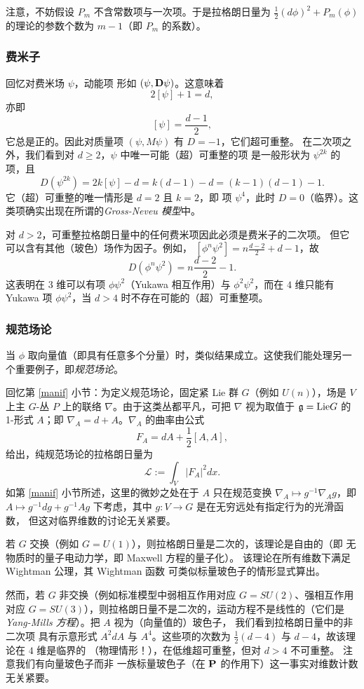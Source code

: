 注意，不妨假设 $P_m$ 不含常数项与一次项。于是拉格朗日量为 $\frac{1}{2}(d \phi)^2+P_m(\phi)$ 的理论的参数个数为 $m-1$（即 $P_m$ 的系数）。

\subsubsection{费米子}

回忆对费米场 $\psi$，动能项
形如 $(\psi,\bold D\psi)$。这意味着
$$
2[\psi]+1=d,
$$
亦即
$$
[\psi]=\frac{d-1}{2},
$$
它总是正的。因此对质量项 $(\psi,M\psi)$ 有 $D=-1$，它们超可重整。
在二次项之外，我们看到对 $d\ge 2$，$\psi$ 中唯一可能（超）可重整的项
是一般形状为 $\psi^{2k}$ 的项，且
$$
D(\psi^{2k})=2k[\psi]-d=k(d-1)-d=(k-1)(d-1)-1.
$$
它（超）可重整的唯一情形是 $d=2$ 且 $k=2$，即
项 $\psi^4$，此时 $D=0$（临界）。这类项确实出现在所谓的\emph{Gross-Neveu 模型}中。

对 $d>2$，可重整拉格朗日量中的任何费米项因此必须是费米子的二次项。
但它可以含有其他（玻色）场作为因子。例如，
$[\phi^n\psi^2]=n\frac{d-2}{2}+d-1$，故
$$
D(\phi^n\psi^2)=n\frac{d-2}{2}-1.
$$
这表明在 3 维可以有项
$\phi\psi^2$（Yukawa 相互作用）与 $\phi^2\psi^2$，而在 $4$ 维只能有
Yukawa 项 $\phi\psi^2$，当 $d>4$ 时不存在可能的（超）可重整项。

\subsubsection{规范场论}
当 $\phi$ 取向量值（即具有任意多个分量）时，类似结果成立。这使我们能处理另一个重要例子，即\emph{规范场论}。

回忆第 \ref{manif} 小节：为定义规范场论，固定紧 Lie 群 $G$（例如 $U(n)$），场是 $V$ 上主 $G$-丛 $P$ 上的联络 $\nabla$。由于这类丛都平凡，可把 $\nabla$ 视为取值于 $\g={\rm Lie}G$ 的 1-形式 $A$；即 $\nabla_A=d+A$。$\nabla_A$ 的曲率由公式
$$
F_A=dA+\frac{1}{2}[A,A],
$$
给出，纯规范场论的拉格朗日量为
$$
\mathcal L:=\int_V |F_A|^2dx.
$$
如第 \ref{manif} 小节所述，这里的微妙之处在于 $A$ 只在规范变换
$\nabla_A\mapsto g^{-1}\nabla_Ag$，即
$A\mapsto g^{-1}dg+g^{-1}Ag$ 下考虑，其中 $g: V\to G$
是在无穷远处有指定行为的光滑函数，
但这对临界维数的讨论无关紧要。

若 $G$ 交换（例如 $G=U(1)$），则拉格朗日量是二次的，该理论是自由的（即
无物质时的量子电动力学，即 Maxwell 方程的量子化）。
该理论在所有维数下满足 Wightman 公理，其 Wightman 函数
可类似标量玻色子的情形显式算出。

然而，若 $G$ 非交换（例如标准模型中弱相互作用对应 $G=SU(2)$、强相互作用对应 $G=SU(3)$），则拉格朗日量不是二次的，运动方程不是线性的（它们是\emph{Yang-Mills 方程}）。把 $A$ 视为（向量值的）玻色子，
我们看到拉格朗日量中的非二次项
具有示意形式 $A^2dA$ 与 $A^4$。这些项的次数为
$\frac{1}{2}(d-4)$ 与 $d-4$，故该理论在 $4$ 维是临界的
（物理情形！），在低维超可重整，但对 $d>4$ 不可重整。
注意我们有向量玻色子而非
一族标量玻色子（在 $\bold P$ 的作用下）这一事实对维数计数无关紧要。


